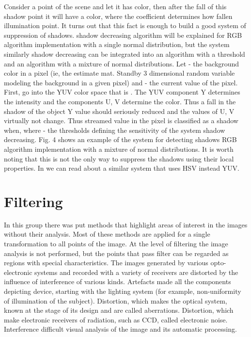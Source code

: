 Consider a point of the scene and let it has color, then after the fall of this shadow point it will have a color, where the coefficient determines how fallen illumination point. It turns out that this fact is enough to build a good system of suppression of shadows. shadow decreasing algorithm will be explained for RGB algorithm implementation with a single normal distribution, but the system similarly shadow decreasing can be integrated into an algorithm with a threshold and an algorithm with a mixture of normal distributions. Let - the background color in a pixel (ie, the estimate mat. Standby 3 dimensional random variable modeling the background in a given pixel) and - the current value of the pixel. First, go into the YUV color space that is . The YUV component Y determines the intensity and the components U, V determine the color. Thus a fall in the shadow of the object Y value should seriously reduced and the values of U, V virtually not change. Thus streamed value in the pixel is classified as a shadow when, where - the thresholds defining the sensitivity of the system shadow decreasing. Fig. 4 shows an example of the system for detecting shadows RGB algorithm implementation with a mixture of normal distributions. It is worth noting that this is not the only way to suppress the shadows using their local properties. In \cite{Cucchiara} we can read about a similar system that uses HSV instead YUV.


\section{Filtering}

In this group there was put methods that highlight areas of interest in the images without their analysis. Most of these methods are applied for a single transformation to all points of the image. At the level of filtering the image analysis is not performed, but the points that pass filter can be regarded as regions with special characteristics. The images generated by various opto-electronic systems and recorded with a variety of receivers are distorted by the influence of interference of various kinds.\cite{Gonzalez} Artefacts made all the components depicting device, starting with the lighting system (for example, non-uniformity of illumination of the subject). Distortion, which makes the optical system, known at the stage of its design and are called aberrations. Distortion, which make electronic receivers of radiation, such as CCD, called electronic noise. Interference difficult visual analysis of the image and its automatic processing.

